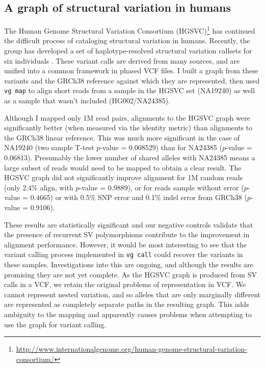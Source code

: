 \subsection{A graph of structural variation in humans}

The Human Genome Structural Variation Consortium (HGSVC)\footnote{\url{http://www.internationalgenome.org/human-genome-structural-variation-consortium/}} has continued the difficult process of cataloging structural variation in humans.
Recently, the group has developed a set of haplotype-resolved structural variation callsets for six individuals \cite{chaisson2018multi}.
These variant calls are derived from many sources, and are unified into a common framework in phased VCF files.
I built a graph from these variants and the GRCh38 reference against which they are represented, then used {\tt vg map} to align short reads from a sample in the HGSVC set (NA19240) as well as a sample that wasn't included (HG002/NA24385).

Although I mapped only 1M read pairs, alignments to the HGSVC graph were significantly better (when measured via the identity metric) than alignments to the GRCh38 linear reference.
This was much more significant in the case of NA19240 (two sample T-test $p$-value = 0.008529) than for NA24385 ($p$-value = 0.06813).
Presumably the lower number of shared alleles with NA24385 means a large subset of reads would need to be mapped to obtain a clear result.
The HGSVC graph did not significantly improve alignment for 1M random reads (only 2.4\% align, with $p$-value = 0.9889), or for reads sample without error ($p$-value = 0.4665) or with 0.5\% SNP error and 0.1\% indel error from GRCh38 ($p$-value = 0.9106).

These results are statistically significant and our negative controls validate that the presence of recurrent SV polymorphisms contribute to the improvement in alignment performance.
However, it would be most interesting to see that the variant calling process implemented in {\tt vg call} could recover the variants in these samples.
Investigations into this are ongoing, and although the results are promising they are not yet complete.
As the HGSVC graph is produced from SV calls in a VCF, we retain the original problems of representation in VCF.
We cannot represent nested variation, and so alleles that are only marginally different are represented as completely separate paths in the resulting graph.
This adds ambiguity to the mapping and apparently causes problems when attempting to use the graph for variant calling.

